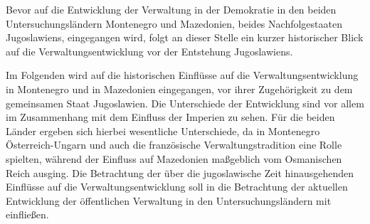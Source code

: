 Bevor auf die Entwicklung der Verwaltung in der Demokratie in den beiden Untersuchungsländern Montenegro und Mazedonien, beides Nachfolgestaaten Jugoslawiens, eingegangen wird, folgt an dieser Stelle ein kurzer historischer Blick auf die Verwaltungsentwicklung vor der Entstehung Jugoslawiens.\par
Im Folgenden wird auf die historischen Einflüsse auf die Verwaltungsentwicklung in Montenegro und in Mazedonien eingegangen, vor ihrer Zugehörigkeit zu dem gemeinsamen Staat Jugoslawien. Die Unterschiede der Entwicklung sind vor allem im Zusammenhang mit dem Einfluss der Imperien zu sehen. Für die beiden Länder ergeben sich hierbei wesentliche Unterschiede, da in Montenegro Österreich-Ungarn und auch die französische Verwaltungstradition eine Rolle spielten, während der Einfluss auf Mazedonien maßgeblich vom Osmanischen Reich ausging. Die Betrachtung der über die jugoslawische Zeit hinausgehenden Einflüsse auf die Verwaltungsentwicklung soll in die Betrachtung der aktuellen Entwicklung der öffentlichen Verwaltung in den Untersuchungsländern mit einfließen.


